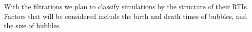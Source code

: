 \documentclass[12pt, fullpage,letterpaper]{article}
\begin{document}
	With the filtrations we plan to classify simulations by the structure of their RTIs. Factors that will be considered include the birth and death times of bubbles, and the size of bubbles.
%  
%	
%
%	
%	
\end{document}
